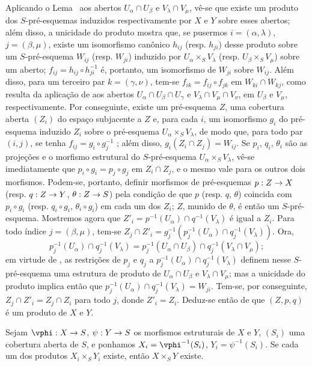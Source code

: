 \documentclass[oneside]{amsart}
\makeatletter
\newcommand{\ega@arrow}[2]{\mathchoice{#1}{#2}{#2}{#2}}
\renewcommand{\to}{\ega@arrow{\longrightarrow}{\rightarrow}}
\let\EGAOriginalLabel\label
\renewcommand{\label}[1]{\phantomsection\EGAOriginalLabel{#1}}
\makeatother
\begin{document}
Aplicando o Lema~ aos abertos
$U_\alpha\cap U_\beta$ e $V_\lambda\cap V_\mu$, vê-se que existe um produto
dos $S$-pré-esquemas induzidos respectivamente por $X$ e $Y$ sobre esses
abertos; além disso, a unicidade do produto mostra que, se pusermos
$i=(\alpha,\lambda)$, $j=(\beta,\mu)$, existe um isomorfismo canônico
$h_{ij}$ (resp. $h_{ji}$) desse produto sobre um $S$-pré-esquema $W_{ij}$
(resp. $W_{ji}$) induzido por $U_\alpha\times_S V_\lambda$
(resp. $U_\beta\times_S V_\mu$) sobre um aberto;
$f_{ij}=h_{ij}\circ h_{ji}^{-1}$ é, portanto, um isomorfismo de $W_{ji}$
sobre $W_{ij}$. Além disso, para um terceiro par $k=(\gamma,\nu)$, tem-se
$f_{ik}=f_{ij}\circ f_{jk}$ em $W_{ki}\cap W_{kj}$, como resulta da
aplicação de  aos abertos
$U_\alpha\cap U_\beta\cap U_\gamma$ e
$V_\lambda\cap V_\mu\cap V_\nu$, em $U_\beta$ e $V_\mu$,
respectivamente. Por conseguinte, existe um pré-esquema $Z$, uma cobertura
aberta $(Z_i)$ do espaço subjacente a $Z$ e, para cada $i$, um isomorfismo
$g_i$ do pré-esquema induzido $Z_i$ sobre o pré-esquema
$U_\alpha\times_S V_\lambda$, de modo que, para todo par $(i,j)$, se tenha
$f_{ij}=g_i\circ g_j^{-1}$ ; além disso,
$g_i(Z_i\cap Z_j)=W_{ij}$. Se $p_i$, $q_i$, $\theta_i$ são as projeções e o
morfismo estrutural do $S$-pré-esquema $U_\alpha\times_S V_\lambda$, vê-se
imediatamente que $p_i\circ g_i=p_j\circ g_j$ em $Z_i\cap Z_j$, e o mesmo
vale para os outros dois morfismos. Podem-se, portanto, definir morfismos de
pré-esquemas $p:Z\to X$ (resp. $q:Z\to Y$, $\theta:Z\to S$) pela condição de
que $p$ (resp. $q$, $\theta$) coincida com $p_i\circ g_i$
(resp. $q_i\circ g_i$, $\theta_i\circ g_i$) em cada um dos $Z_i$; $Z$,
munido de $\theta$, é então um $S$-pré-esquema. Mostremos agora que
$Z'_i=p^{-1}(U_\alpha)\cap q^{-1}(V_\lambda)$ é igual a $Z_i$. Para todo
índice $j=(\beta,\mu)$, tem-se
$Z_j\cap Z'_i=g_j^{-1}(p_j^{-1}(U_\alpha)\cap q_j^{-1}(V_\lambda))$. Ora,
\[
  p_j^{-1}(U_\alpha)\cap q_j^{-1}(V_\lambda)
  =p_j^{-1}(U_\alpha\cap U_\beta)\cap
   q_j^{-1}(V_\lambda\cap V_\mu);
\]
em virtude de , as restrições de $p_j$ e $q_j$ a
$p_j^{-1}(U_\alpha)\cap q_j^{-1}(V_\lambda)$ definem nesse
$S$-pré-esquema uma estrutura de produto de $U_\alpha\cap U_\beta$ e
$V_\lambda\cap V_\mu$; mas a unicidade do produto implica então que
$p_j^{-1}(U_\alpha)\cap q_j^{-1}(V_\lambda)=W_{ji}$. Tem-se, por
conseguinte, $Z_j\cap Z'_i=Z_j\cap Z_i$ para todo $j$, donde $Z'_i=Z_i$.
Deduz-se então de  que $(Z,p,q)$ é um produto de $X$ e $Y$.

\begin{lemma}[3.2.6.4]
\label{I.3.2.6.4}
Sejam $\vphi:X\to S$, $\psi:Y\to S$ os morfismos estruturais de $X$ e
$Y$, $(S_i)$ uma cobertura aberta de $S$, e ponhamos
$X_i=\vphi^{-1}(S_i)$, $Y_i=\psi^{-1}(S_i)$. Se cada um dos produtos
$X_i\times_S Y_i$ existe, então $X\times_S Y$ existe.
\end{lemma}
\end{document}
